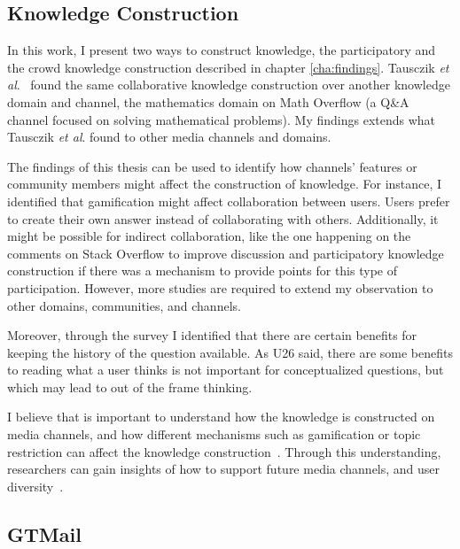 \documentclass{sig-alternate-05-2015}
\begin{document}
\subsection{Knowledge Construction}

	In this work, I present two ways to construct knowledge, the participatory and the crowd knowledge construction described in chapter \ref{cha:findings}.
	Tausczik \textit{et al}.~\cite{Tausczik2014} found the same collaborative knowledge construction over another knowledge domain and channel, the mathematics domain on Math Overflow (a Q\&A channel focused on solving mathematical problems).
	My findings extends what Tausczik \textit{et al}. found to other media channels and domains.

	The findings of this thesis can be used to identify how channels' features or community members might affect the construction of knowledge.
	For instance, I identified that gamification might affect collaboration between users. 
	Users prefer to create their own answer instead of collaborating with others.
	Additionally, it might be possible for indirect collaboration, like the one happening on the comments on Stack Overflow to improve discussion and participatory knowledge construction if there was a mechanism to provide points for this type of participation.
	However, more studies are required to extend my observation to other domains, communities, and channels.

	Moreover, through the survey I identified that there are certain benefits for keeping the history of the question available.
	As U26 said, there are some benefits to reading what a user thinks is not important for conceptualized questions, but which may lead to out of the frame thinking. 

	I believe that is important to understand how the knowledge is constructed on media channels, and how different mechanisms such as gamification or topic restriction can affect the knowledge construction~\cite{Li2015}.
	Through this understanding, researchers can gain insights of how to support future media channels, and user diversity~\cite{Vasilescu2014b}. 	

\subsection{GTMail}
\end{document}
